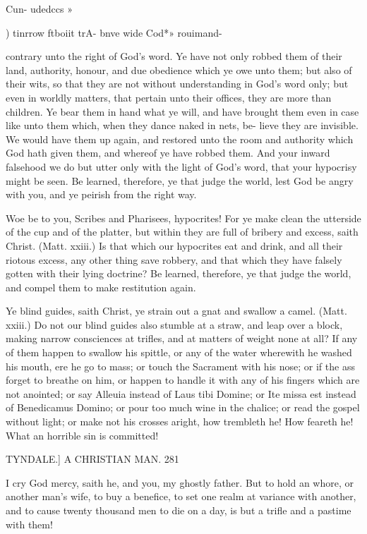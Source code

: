 \documentclass{custom}
\begin{document}
{Cun- 
udedccs 
»{) tinrrow 
ftboiit trA- 
bnve wide 
Cod*» 
rouimand- 

contrary unto the right of God's word. Ye have not only 
robbed them of their land, authority, honour, and due 
obedience which ye owe unto them; but also of their 
wits, so that they are not without understanding in God's 
word only; but even in worldly matters, that pertain unto 
their offices, they are more than children. Ye bear them 
in hand what ye will, and have brought them even in case 
like unto them which, when they dance naked in nets, be- 
lieve they are invisible. We would have them up again, 
and restored unto the room and authority which God hath 
given them, and whereof ye have robbed them. And your 
inward falsehood we do but utter only with the light of 
God's word, that your hypocrisy might be seen. Be 
learned, therefore, ye that judge the world, lest God be 
angry with you, and ye peirish from the right way. 

Woe be to you, Scribes and Pharisees, hypocrites! 
For ye make clean the utterside of the cup and of the 
platter, but within they are full of bribery and excess, 
saith Christ. (Matt. xxiii.) Is that which our hypocrites 
eat and drink, and all their riotous excess, any other thing 
save robbery, and that which they have falsely gotten with 
their lying doctrine? Be learned, therefore, ye that judge 
the world, and compel them to make restitution again. 

Ye blind guides, saith Christ, ye strain out a gnat and 
swallow a camel. (Matt. xxiii.) Do not our blind 
guides also stumble at a straw, and leap over a block, 
making narrow consciences at trifles, and at matters of 
weight none at all? If any of them happen to swallow 
his spittle, or any of the water wherewith he washed his 
mouth, ere he go to mass; or touch the Sacrament with 
his nose; or if the ass forget to breathe on him, or happen 
to handle it with any of his fingers which are not anointed; 
or say Alleuia instead of Laus tibi Domine; or Ite 
missa est instead of Benedicamus Domino; or pour too 
much wine in the chalice; or read the gospel without 
light; or make not his crosses aright, how trembleth he! 
How feareth he! What an horrible sin is committed! 


TYNDALE.]
A CHRISTIAN MAN.
281 

I cry God mercy, saith he, and you, my ghostly father. 
But to hold an whore, or another man's wife, to buy a 
benefice, to set one realm at variance with another, and to 
cause twenty thousand men to die on a day, is but a 
trifle and a pastime with them! 

}}
\end{document}
